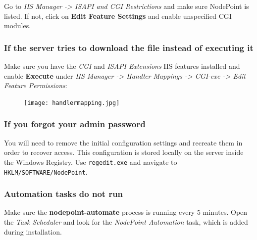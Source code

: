 \documentclass[11pt]{article}
\begin{document}
{Go to \textit{IIS Manager -> ISAPI and CGI Restrictions} and make sure NodePoint is listed. If not, click on \textbf{Edit Feature Settings} and enable unspecified CGI modules.

\subsubsection{If the server tries to download the file instead of executing it}

Make sure you have the \textit{CGI} and \textit{ISAPI Extensions} IIS features installed and enable \textbf{Execute} under \textit{IIS Manager -> Handler Mappings -> CGI-exe -> Edit Feature Permissions}:

\begin{figure}[h]
\texttt{[image: handlermapping.jpg]}
\end{figure}

\subsubsection{If you forgot your admin password}

You will need to remove the initial configuration settings and recreate them in order to recover access. This configuration is stored locally on the server inside the Windows Registry. Use \texttt{regedit.exe} and navigate to \texttt{HKLM/SOFTWARE/NodePoint}.

\subsubsection{Automation tasks do not run}

Make sure the \textbf{nodepoint-automate} process is running every 5 minutes. Open the \textit{Task Scheduler} and look for the \textit{NodePoint Automation} task, which is added during installation.
}
\end{document}
